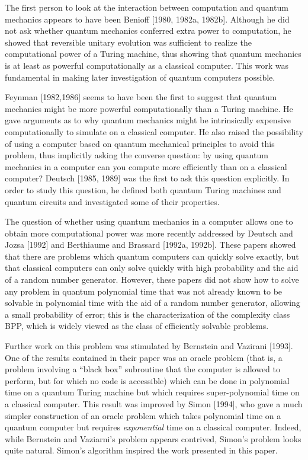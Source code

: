 The first person to look at the interaction between computation and
quantum mechanics appears to have been Benioff [1980, 1982a, 1982b].  
Although he did not ask whether quantum mechanics conferred extra power to 
computation, he showed that reversible unitary evolution was sufficient
to realize the computational power of a Turing machine,
thus showing that quantum mechanics is at least as powerful computationally
as a classical computer.  This work was fundamental in making
later investigation of quantum computers possible.

Feynman [1982,1986] seems to have been the first to suggest that quantum 
mechanics might be more powerful computationally than a Turing machine.
He gave arguments as to why quantum mechanics might be
intrinsically expensive computationally to simulate on a classical
computer.  He also raised the possibility of using a 
computer based on quantum mechanical principles to avoid this problem, thus 
implicitly asking the converse question: by using quantum mechanics in a 
computer can you compute more efficiently than on a classical computer?
Deutsch [1985, 1989] was the first to ask this question explicitly.
In order to study this question,
he defined both quantum Turing machines and quantum circuits and 
investigated some of their properties.

The question of whether using quantum mechanics in a computer allows one to 
obtain more computational power was more recently addressed by 
Deutsch and Jozsa [1992] and Berthiaume and Brassard [1992a, 1992b]. 
These papers showed that there are problems which quantum computers
can quickly solve exactly, but that classical computers can only solve
quickly with high probability and the aid of a random number generator.
However, these papers did not show how to solve any problem 
in quantum polynomial time that was not already known to be solvable in 
polynomial time with the aid of a random number generator, 
allowing a small probability of error;
this is the characterization of the complexity class BPP, which 
is widely viewed as the class of efficiently solvable problems.

Further work on this problem was stimulated by Bernstein and Vazirani [1993].
One of the results contained in 
their paper was an oracle problem (that is, a problem involving a 
``black box'' subroutine that the computer is allowed to perform,
but for which no code is accessible) which can be done in polynomial 
time on a quantum Turing machine but which requires super-polynomial time 
on a classical computer.  This result was improved
by Simon [1994], who gave a much simpler construction of an
oracle problem which takes polynomial time on a quantum computer but
requires {\em exponential} time on a classical computer.  Indeed, 
while Bernstein and Vaziarni's problem appears contrived, Simon's
problem looks quite natural.
Simon's algorithm inspired the work presented in this paper.

